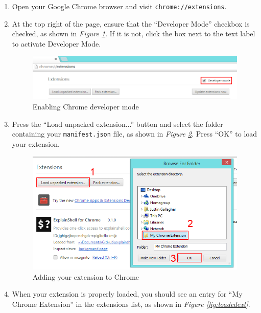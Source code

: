 \documentclass[11pt]{article}
\begin{document}
\begin{enumerate}
	\item Open your Google Chrome browser and visit \texttt{chrome://extensions}.
	\item At the top right of the page, ensure that the ``Developer Mode'' checkbox is checked, as shown in \emph{Figure \ref{fig:devmode}}. If it is not, click the box next to the text label to activate Developer Mode.\\

	\begin{figure}[htb]
	\centering
	\includegraphics[width=1\textwidth]{figures/devmode.png}
	\caption{Enabling Chrome developer mode\label{fig:devmode}}
	\end{figure}

	\item Press the ``Load unpacked extension...'' button and select the folder containing your \texttt{manifest.json} file, as shown in \emph{Figure \ref{fig:loadext}}. Press ``OK'' to load your extension.\\

	\begin{figure}[htb]
	\centering
	\includegraphics[height=0.5\textwidth]{figures/loadext.png}
	\caption{Adding your extension to Chrome\label{fig:loadext}}
	\end{figure}

	\item When your extension is properly loaded, you should see an entry for ``My Chrome Extension'' in the extensions list, as shown in \emph{Figure \ref{fig:loadedext}}.\\


\end{enumerate}
\end{document}
